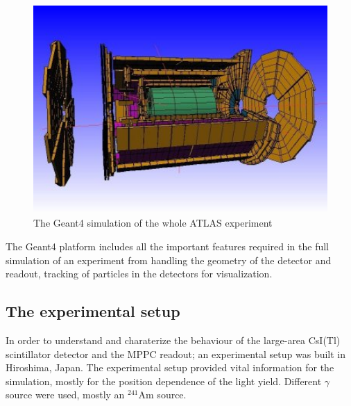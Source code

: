 \documentclass[12pt, a4paper,titlepage]{article}
\numberwithin{equation}{section}
\numberwithin{figure}{section}
\begin{document}
\begin{figure}[H]
\centering
\includegraphics[width=130.0mm]{images/AtlasHalf.jpg}
\caption{The Geant4 simulation of the whole ATLAS experiment}
\end{figure}

The Geant4 platform includes all the important features required in the full simulation of an experiment from handling the geometry of the detector and readout, tracking of particles in the detectors for visualization.

\subsection{The experimental setup}

In order to understand and charaterize the behaviour of the large-area CsI(Tl) scintillator detector and the MPPC readout; an experimental setup was built in Hiroshima, Japan. The experimental setup provided vital information for the simulation, mostly for the position dependence of the light yield. Different $\gamma$ source were used, mostly an $^{241}$Am source. 
\end{document}
